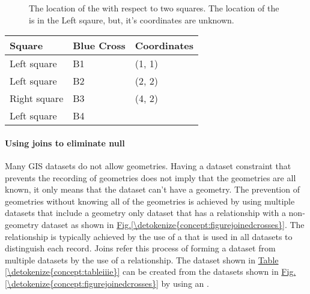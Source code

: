 \documentclass[letterpaper,10pt,english]{sphinxmanual}
\begin{document}
\begin{figure}[htbp]
\centering
\capstart

\noindent{}
\caption{The location of the  with respect to two squares.  The location of the  is in the Left sqaure, but, it’s coordinates are unknown.}\label{\detokenize{concept:id48}}\label{\detokenize{concept:figuresquarenull}}\end{figure}


\begin{savenotes}\sphinxattablestart
\centering
{}
\label{\detokenize{concept:id49}}\label{\detokenize{concept:tableiiie}}
\sphinxaftercaption
\begin{tabulary}{\linewidth}[t]{|T|T|T|}
\hline
\sphinxstyletheadfamily 
Square
&\sphinxstyletheadfamily 
Blue Cross
&\sphinxstyletheadfamily 
Coordinates
\\
\hline
Left square
&
B1
&
(1, 1)
\\
\hline
Left square
&
B2
&
(2, 2)
\\
\hline
Right square
&
B3
&
(4, 2)
\\
\hline
Left square
&
B4
&
\\
\hline
\end{tabulary}
\par
\sphinxattableend\end{savenotes}


\paragraph{Using joins to eliminate null}
\label{\detokenize{concept:using-joins-to-eliminate-null}}
Many GIS datasets do not allow  geometries.  Having a dataset constraint that prevents the recording of  geometries does not imply that the geometries are all known, it only means that the dataset can’t have a  geometry.  The prevention of  geometries without knowing all of the geometries is achieved by using multiple datasets that include a geometry only dataset that has a relationship with a non-geometry dataset as shown in \hyperref[\detokenize{concept:figurejoinedcrosses}]{Fig.\@ \ref{\detokenize{concept:figurejoinedcrosses}}}.  The relationship is typically achieved by the use of a  that is used in all datasets to distinguish each record.  Joins refer this process of forming a dataset from multiple datasets by the use of a relationship.  The dataset shown in \hyperref[\detokenize{concept:tableiiie}]{Table \ref{\detokenize{concept:tableiiie}}} can be created from the datasets shown in \hyperref[\detokenize{concept:figurejoinedcrosses}]{Fig.\@ \ref{\detokenize{concept:figurejoinedcrosses}}} by using an .
\end{document}
